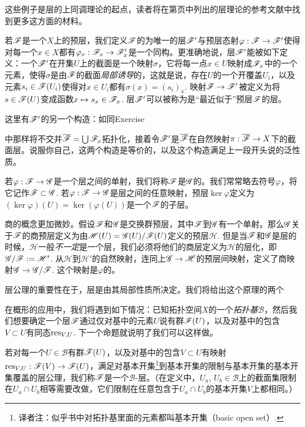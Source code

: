 这些例子是层的上同调理论的起点，读者将在第\pageref{ref:1}页中列出的层理论的参考文献中找到更多这方面的材料。

若$\mathscr{F}$是一个$X$上的预层，我们定义$\mathscr{F}$的为唯一的层$\mathscr{F}'$与预层态射$\varphi:\mathscr{F}\to\mathscr{F}'$使得对每一个$x\in X$都有$\varphi_x:\mathscr{F}_x\to\mathscr{F}'_x$是一个同构。更准确地说，层$\mathscr{F}'$能被如下定义：一个$\mathscr{F}'$在开集$U$上的截面是一个映射$\sigma$，它将每一点$x\in U$映射成$\mathscr{F}_x$中的一个元素，使得$\sigma$是由$\mathscr{F}$的截面\textit{局部诱导}的，这就是说，存在$U$的一个开覆盖$U_i$，以及元素$s_i\in \mathscr{F}(U_i)$使得对$x\in U_i$都有$\sigma(x)=(s_i)_x$. 映射$\mathscr{F}\to\mathscr{F}'$被定义为将$s\in\mathscr{F}(U)$变成函数$x\mapsto s_x\in\mathscr{F}_x$. 层$\mathscr{F}'$可以被称为是“最近似于”预层$\mathscr{F}$的层。

\begin{exe}
	这里有$\mathscr{F}'$的另一个构造：如同Exercise {{\addtocounter{thm}{-3}}\thethm{\addtocounter{thm}{3}}}中那样将不交并$\overline{\mathscr{F}}=\bigcup \mathscr{F}_x$拓扑化，接着令$\mathscr{F}'$是$\overline{\mathscr{F}}$在自然映射$\pi:\overline{\mathscr{F}}\to X$下的截面层。说服你自己，这两个构造是等价的，以及这个构造满足上一段开头说的泛性质。
\end{exe}

若$\varphi:\mathscr{F}\to\mathscr{G}$是一个层之间的单射，我们将称$\mathscr{F}$是$\mathscr{G}$的。我们常常略去符号$\varphi$，将它记作$\mathscr{F}\subset \mathscr{G}$. 若$\varphi:\mathscr{F}\to\mathscr{G}$是层之间的任意映射，预层$\ker\varphi$定义为$(\ker\varphi)(U)=\ker(\varphi(U))$是一个$\mathscr{F}$的子层。

商的概念更加微妙。假设$\mathscr{F}$和$\mathscr{G}$是交换群预层，其中$\mathscr{F}$到$\mathscr{G}$有一个单射。那么$\mathscr{G}$关于$\mathscr{F}$的商预层定义为由$\mathscr{H}(U)=\mathscr{G}(U)/\mathscr{F}(U)$定义的预层$\mathscr{H}$. 但是当$\mathscr{F}$和$\mathscr{G}$是层的时候，$\mathscr{H}$一般\textit{不一定}是一个层，我们必须将他们的商层定义为$\mathscr{H}$的层化，即$\mathscr{G}/\mathscr{F}:=\mathscr{H}'$. 从$\mathscr{H}$到$\mathscr{H}'$的自然映射，连同上$\mathscr{G}\to \mathscr{H}$的预层间映射，定义了商映射$\mathscr{G}\to \mathscr{G}/\mathscr{F}$. 这个映射是$\varphi$的。

层公理的重要性在于，层是由其局部性质所决定。我们将给出这个原理的两个

在概形的应用中，我们将遇到如下情况：已知拓扑空间$X$的一个\textit{拓扑基}$\mathscr{B}$，然后我们想要确定一个层$\mathscr{F}$通过仅对基中的元素$U$说有群$\mathscr{F}(U)$，以及对基中的包含$V\subset U$有同态$\operatorname{res}_{V,U}$. 下一个命题就说明了我们可以这样做。

若对每一个$U\in\mathscr{B}$有群$\mathscr{F}(U)$，以及对基中的包含$V\subset U$有映射$\operatorname{res}_{V,U}:\mathscr{F}(V)\to \mathscr{F}(U)$，满足对基本开集\footnote{译者注：似乎书中对拓扑基里面的元素都叫基本开集（basic open set）.}到基本开集的限制与基本开集的基本开集覆盖的层公理，我们称$\mathscr{F}$是一个$\mathscr{B}$-层。（在定义中，$U_a$, $U_b\in\mathscr{B}$上的截面集限制在$U_a\cap U_b$相等需要改做，它们限制在任意包含于$U_a\cap U_b$的基本开集$V$上都相同。）

